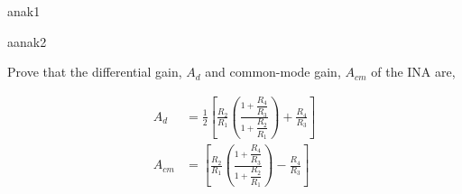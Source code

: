 \documentclass[12pt]{article}
\begin{document}
	
	\listbeginx	%
		\item anak1
		
		
		
		\listbeginx	%
			\item aanak2
		
		
			
		\listclose 
	\listclose 
	
	
\listclose %

\clearpage
\question{}

\listbeginx	%
	\item Prove that the differential gain, $A_d$ and common-mode gain, $A_{cm}$ of the INA are, 
	
	
	\begin{align*} 
		A_d &= \frac{1}{2}
		\left[
			\frac{R_2}{R_1}
				\left(\frac
					{1+\dfrac{R_4}{R_3}}
					{1+\dfrac{R_2}{R_1}}
				\right)
			+\frac{R_4}{R_3}
		\right] \\
		A_{cm} &= 
		\left[
			\frac{R_2}{R_1}
				\left(\frac
					{1+\dfrac{R_4}{R_3}}
					{1+\dfrac{R_2}{R_1}}
				\right)
			-\frac{R_4}{R_3}
		\right] 
	\end{align*}
	

\listclose	%

\paperend
\end{document}
